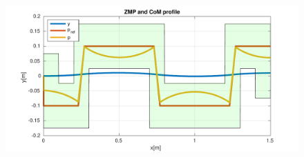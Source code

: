 \documentclass[a4paper]{article}
\begin{document}
\begin{figure}

     \begin{minipage}[b]{0.48\textwidth}
         \centering
       \includegraphics[scale=0.4]{plot/optimization/opt_y_150_space.pdf}

\end{minipage}
\end{figure}
\end{document}
